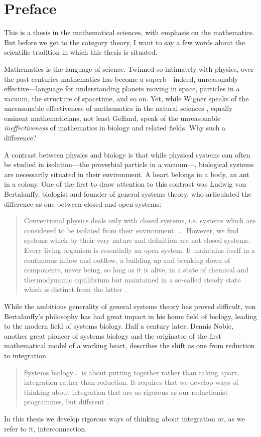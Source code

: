 {}
\chapter*{Preface}

This is a thesis in the mathematical sciences, with emphasis on the mathematics.
But before we get to the category theory, I want to say a few words about the
scientific tradition in which this thesis is situated.

Mathematics is the language of science. Twinned so intimately with physics, over
the past centuries mathematics has become a superb---indeed, unreasonably
effective---language for understanding planets moving in space, particles in a
vacuum, the structure of spacetime, and so on.  Yet, while Wigner speaks of the
unreasonable effectiveness of mathematics in the natural sciences \cite{Wig60},
equally eminent mathematicians, not least Gelfand, speak of the unreasonable
\emph{ineffectiveness} of mathematics in biology \cite{Mon07} and related
fields. Why such a difference?

A contrast between physics and biology is that while physical systems can often
be studied in isolation---the proverbial particle in a vacuum---, biological
systems are necessarily situated in their environment. A heart belongs in a
body, an ant in a colony. One of the first to draw attention to this contrast
was Ludwig von Bertalanffy, biologist and founder of general systems theory, who
articulated the difference as one between closed and open systems: 
\begin{quote}
  Conventional physics deals only with closed systems, i.e. systems which are
  considered to be isolated from their environment. \dots\ However, we find
  systems which by their very nature and definition are not closed systems.
  Every living organism is essentially an open system. It maintains itself in a
  continuous inflow and outflow, a building up and breaking down of components,
  never being, so long as it is alive, in a state of chemical and thermodynamic
  equilibrium but maintained in a so-called steady state which is distinct from
  the latter \cite{Ber68}.
\end{quote}
While the ambitious generality of general systems theory has proved difficult,
von Bertalanffy's philosophy has had great impact in his home field of biology,
leading to the modern field of systems biology. Half a century later, Dennis
Noble, another great pioneer of systems biology and the originator of the first
mathematical model of a working heart, describes the shift as one from reduction
to integration.
\begin{quote}
  Systems biology\dots\ is about putting together rather than taking apart,
  integration rather than reduction. It requires that we develop ways of
  thinking about integration that are as rigorous as our reductionist
  programmes, but different \cite{Nob06}.
\end{quote}
In this thesis we develop rigorous ways of thinking about integration or, as we
refer to it, interconnection.

